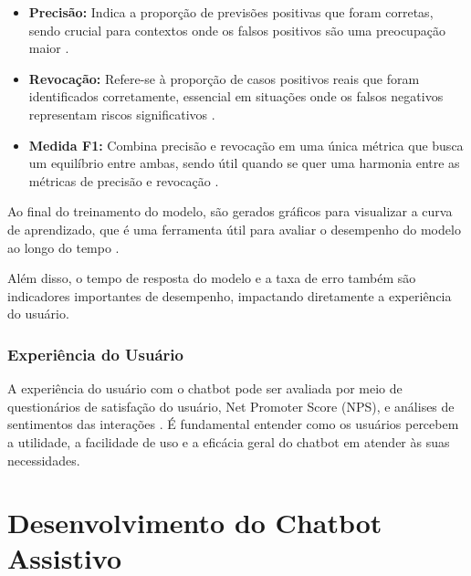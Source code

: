\documentclass[conference]{IEEEtran}
\begin{document}
\begin{itemize}
\item \textbf{Precisão:} Indica a proporção de previsões positivas que foram corretas, 
sendo crucial para contextos onde os falsos positivos são uma preocupação maior \cite{Davis2006}.
\item \textbf{Revocação:} Refere-se à proporção de casos positivos reais que foram identificados corretamente, 
essencial em situações onde os falsos negativos representam riscos significativos \cite{Manning1999}.
\item \textbf{Medida F1:} Combina precisão e revocação em uma única métrica que busca um equilíbrio entre ambas, 
sendo útil quando se quer uma harmonia entre as métricas de precisão e revocação \cite{VanRijsbergen1979}.
\end{itemize}

Ao final do treinamento do modelo, são gerados gráficos para visualizar a curva de aprendizado,
que é uma ferramenta útil para avaliar o desempenho do modelo ao longo do tempo \cite{Bengio2012}.

Além disso, o tempo de resposta do modelo e a taxa de erro também são indicadores importantes de desempenho, 
impactando diretamente a experiência do usuário.

\subsubsection{Experiência do Usuário}
A experiência do usuário com o chatbot pode ser avaliada por meio de questionários de satisfação do usuário, 
Net Promoter Score (NPS), e análises de sentimentos das interações \cite{Reichheld2003}. 
É fundamental entender como os usuários percebem a utilidade, 
a facilidade de uso e a eficácia geral do chatbot em atender às suas necessidades.




\section{Desenvolvimento do Chatbot Assistivo}
\end{document}
